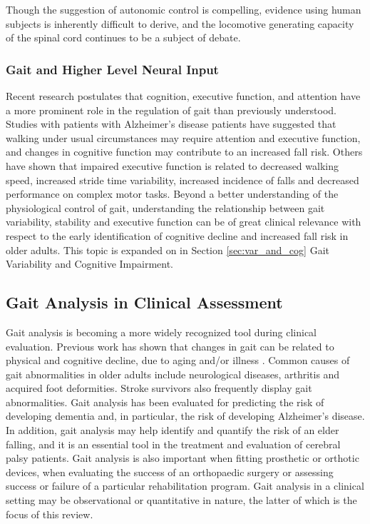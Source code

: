 \documentclass[11pt, oneside]{report}
\begin{document}
Though the suggestion of autonomic control is compelling, evidence using human subjects is inherently difficult to derive, and the locomotive generating capacity of the spinal cord continues to be a subject of debate\cite{Mackay-lyons2002}.

\subsubsection{Gait and Higher Level Neural Input}

Recent research postulates that cognition, executive function, and attention have a more prominent role in the regulation of gait than previously understood\cite{Yogev-Seligmann2008}. Studies with patients with Alzheimer's disease patients have suggested that walking under usual circumstances may require attention and executive function, and changes in cognitive function may contribute to an increased fall risk\cite{Sheridan2007}. Others have shown that impaired executive function is related to decreased walking speed\cite{Persad2008}, increased stride time variability\cite{Allali2008}, increased incidence of falls and decreased performance on complex motor tasks\cite{Yogev-Seligmann2008}. Beyond a better understanding of the physiological control of gait, understanding the relationship between gait variability, stability and executive function can be of great clinical relevance with respect to the early identification of cognitive decline and increased fall risk in older adults\cite{IJmker2012}. This topic is expanded on in Section \ref{sec:var_and_cog} Gait Variability and Cognitive Impairment.

\subsection{Gait Analysis in Clinical Assessment}

Gait analysis is becoming a more widely recognized tool during clinical evaluation. Previous work has shown that changes in gait can be related to physical and cognitive decline\cite{Kluger2008}, due to aging and/or illness \cite{Grabiner2001,Hausdorff2005a}. Common causes of gait abnormalities in older adults include neurological diseases, arthritis and acquired foot deformities\cite{Verghese2002}. Stroke survivors also frequently display gait abnormalities\cite{Patterson2008}. Gait analysis has been evaluated for predicting the risk of developing dementia and, in particular, the risk of developing Alzheimer's disease\cite{Verghese2002}. In addition, gait analysis may help identify and quantify the risk of an elder falling\cite{Toulotte2006}, and it is an essential tool in the treatment and evaluation of cerebral palsy patients\cite{Gage1993}. Gait analysis is also important when fitting prosthetic or orthotic devices, when evaluating the success of an orthopaedic surgery\cite{Aminian2004} or assessing success or failure of a particular rehabilitation program\cite{SantAnna2009}. Gait analysis in a clinical setting may be observational or quantitative in nature, the latter of which is the focus of this review.
\end{document}

